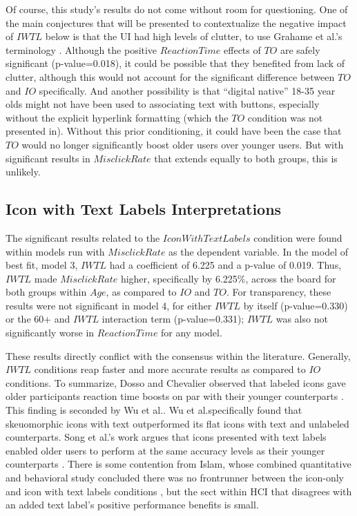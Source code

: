 \documentclass[12pt,twoside]{reedthesis}
\begin{document}
    Of course, this study's results do not come without room for questioning. One of the main conjectures that will be presented to contextualize the negative impact of $IWTL$ below is that the UI had high levels of clutter, to use Grahame et al.\@'s terminology \cite{grahame_age_2004}. Although the positive $ReactionTime$ effects of $TO$ are safely significant (p-value=0.018), it could be possible that they benefited from lack of clutter, although this would not account for the significant difference between $TO$ and $IO$ specifically. And another possibility is that \enquote{digital native} 18-35 year olds might not have been used to associating text with buttons, especially without the explicit hyperlink formatting (which the $TO$ condition was not presented in). Without this prior conditioning, it could have been the case that $TO$ would no longer significantly boost older users over younger users. But with significant results in $Misclick Rate$ that extends equally to both groups, this is unlikely. 

\subsection{Icon with Text Labels Interpretations}\label{5.1.2}
    The significant results related to the $Icon With Text Labels$ condition were found within models run with $Misclick Rate$ as the dependent variable. In the model of best fit, model 3, $IWTL$ had a coefficient of 6.225 and a p-value of 0.019. Thus, $IWTL$ made $Misclick Rate$ higher, specifically by 6.225\%, across the board for both groups within $Age$, as compared to $IO$ and $TO$. For transparency, these results were not significant in model 4, for either $IWTL$ by itself (p-value=0.330) or the 60+ and $IWTL$ interaction term (p-value=0.331); $IWTL$ was also not significantly worse in $ReactionTime$ for any model.

    These results directly conflict with the consensus within the literature. Generally, $IWTL$ conditions reap faster and more accurate results as compared to $IO$ conditions. To summarize, Dosso and Chevalier observed that labeled icons gave older participants reaction time boosts on par with their younger counterparts \cite{dosso_how_2021}. This finding is seconded by Wu et al.\@ \cite{wu_how_2022}. Wu et al.\@ specifically found that skeuomorphic icons with text outperformed its flat icons with text and unlabeled counterparts. Song et al.\@'s work argues that icons presented with text labels enabled older users to perform at the same accuracy levels as their younger counterparts \cite{song_developing_2024}. There is some contention from Islam, whose combined quantitative and behavioral study concluded there was no frontrunner between the icon-only and icon with text labels conditions \cite{islam_exploring_2015}, but the sect within HCI that disagrees with an added text label's positive performance benefits is small.
\end{document}

